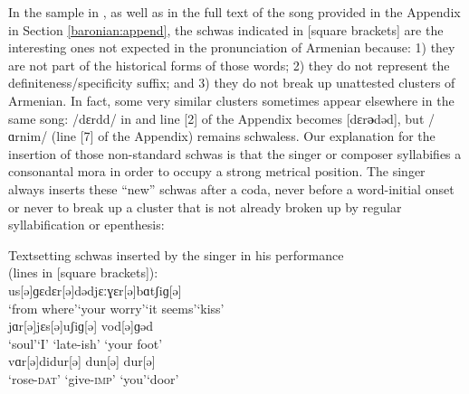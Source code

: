 \documentclass[output=paper,colorlinks,citecolor=brown]{langscibook}
\begin{document}
In the sample in , as well as in the full text of the song provided in the Appendix in Section \ref{baronian:append}, the schwas indicated in [square brackets] are the interesting ones not expected in the pronunciation of Armenian because: 1) they are not part of the historical forms of those words; 2) they do not represent the definiteness\slash specificity suffix; and 3) they do not break up unattested clusters of Armenian.  In fact, some very similar clusters sometimes appear elsewhere in the same song: /dɛrdd/ in  and line [2] of the Appendix becomes [dɛr\textbf{ə}dəd], but /ɑrnim/ (line [7] of the Appendix) remains schwaless.  Our explanation for the insertion of those non-standard schwas is that the singer or composer syllabifies a consonantal mora in order to occupy a strong metrical position.  The singer always inserts these “new” schwas after a coda, never before a word-initial onset or never to break up a cluster that is not already broken up by regular syllabification or epenthesis:

\begin{exe}
    \ex \label{baronian:ex12} Textsetting schwas inserted by the singer in his performance\\(lines in [square brackets]):\smallskip\\
    \relax
    [1] us[ə]ɡɛ\tab		[2] dɛr[ə]dəd\tab		[2] jɛːɣɛr[ə]\tab		[3] bɑtʃiɡ[ə]\\
        ‘from where’\tab		‘your worry’\tab		‘it seems’\tab		‘kiss’\\
    \relax
    [4] jɑr[ə]\tab		[5] jɛs[ə]\tab		[8] uʃiɡ[ə]	\tab	[9] vod[ə]ɡəd	\\
    ‘soul’\tab			‘I’	\tab		‘late-ish’	\tab	‘your foot’\\
    \relax
    [9] vɑr[ə]di\tab		[10] dur[ə]	\tab	[12] dun[ə]	\tab	[13] dur[ə]\\
	‘rose-\textsc{dat}’	\tab	‘give-\textsc{imp}’	\tab	‘you’\tab		 	‘door’
\end{exe}
\end{document}
